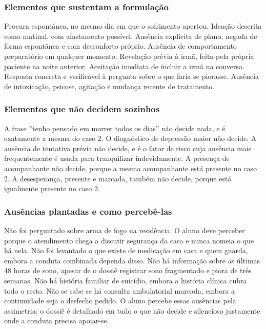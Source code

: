 \subsubsection*{Elementos que sustentam a formulação}

Procura espontânea, no mesmo dia em que o sofrimento apertou. Ideação descrita como matinal, com afastamento possível. Ausência explícita de plano, negada de forma espontânea e com desconforto próprio. Ausência de comportamento preparatório em qualquer momento. Revelação prévia à irmã, feita pela própria paciente na noite anterior. Aceitação imediata de incluir a irmã na conversa. Resposta concreta e verificável à pergunta sobre o que faria se piorasse. Ausência de intoxicação, psicose, agitação e mudança recente de tratamento.

\subsubsection*{Elementos que não decidem sozinhos}

A frase ''tenho pensado em morrer todos os dias'' não decide nada, e é exatamente a mesma do caso 2. O diagnóstico de depressão maior não decide. A ausência de tentativa prévia não decide, e é o fator de risco cuja ausência mais frequentemente é usada para tranquilizar indevidamente. A presença de acompanhante não decide, porque a mesma acompanhante está presente no caso 2. A desesperança, presente e marcada, também não decide, porque está igualmente presente no caso 2.

\subsubsection*{Ausências plantadas e como percebê-las}

Não foi perguntado sobre arma de fogo na residência. O aluno deve perceber porque o atendimento chega a discutir segurança da casa e nunca nomeia o que há nela. Não foi levantado o que existe de medicação em casa e quem guarda, embora a conduta combinada dependa disso. Não há informação sobre as últimas 48 horas de sono, apesar de o dossiê registrar sono fragmentado e piora de três semanas. Não há história familiar de suicídio, embora a história clínica cubra todo o resto. Não se sabe se há consulta ambulatorial marcada, embora a continuidade seja o desfecho pedido. O aluno percebe essas ausências pela assimetria: o dossiê é detalhado em tudo o que não decide e silencioso justamente onde a conduta precisa apoiar-se.

